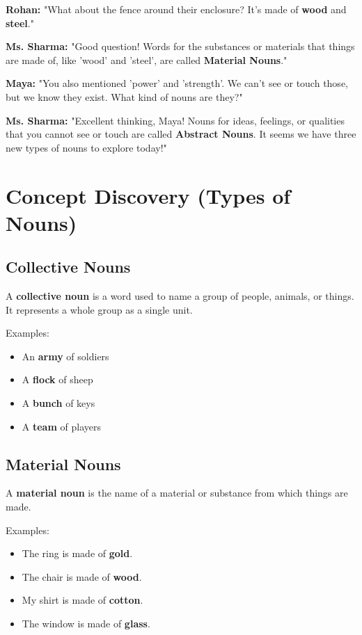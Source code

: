 \textbf{Rohan:} "What about the fence around their enclosure? It's made of \textbf{wood} and \textbf{steel}."

\textbf{Ms. Sharma:} "Good question! Words for the substances or materials that things are made of, like 'wood' and 'steel', are called \textbf{Material Nouns}."

\textbf{Maya:} "You also mentioned 'power' and 'strength'. We can't see or touch those, but we know they exist. What kind of nouns are they?"

\textbf{Ms. Sharma:} "Excellent thinking, Maya! Nouns for ideas, feelings, or qualities that you cannot see or touch are called \textbf{Abstract Nouns}. It seems we have three new types of nouns to explore today!"

\section{Concept Discovery (Types of Nouns)}
\subsection{Collective Nouns}
A \textbf{collective noun} is a word used to name a group of people, animals, or things. It represents a whole group as a single unit.

Examples:
\begin{itemize}
    \item An \textbf{army} of soldiers
    \item A \textbf{flock} of sheep
    \item A \textbf{bunch} of keys
    \item A \textbf{team} of players
\end{itemize}

\subsection{Material Nouns}
A \textbf{material noun} is the name of a material or substance from which things are made.

Examples:
\begin{itemize}
    \item The ring is made of \textbf{gold}.
    \item The chair is made of \textbf{wood}.
    \item My shirt is made of \textbf{cotton}.
    \item The window is made of \textbf{glass}.
\end{itemize}

